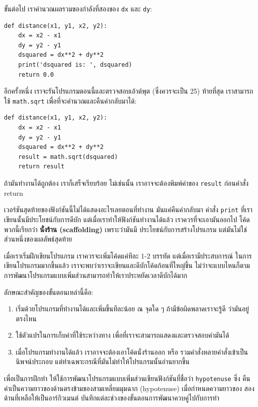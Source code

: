 ขั้นต่อไป เราคำนวณผลรวมของกำลังที่สองของ {\tt dx} และ {\tt dy}:

\begin{verbatim}
def distance(x1, y1, x2, y2):
    dx = x2 - x1
    dy = y2 - y1
    dsquared = dx**2 + dy**2
    print('dsquared is: ', dsquared)
    return 0.0
\end{verbatim}
%
อีกครั้งหนึ่ง เราจะรันโปรแกรมตอนนี้และตรวจสอบเอ้าต์พุต (ซึ่งควรจะเป็น 25)
ท้ายที่สุด เราสามารถใช้ {\tt math.sqrt} เพื่อที่จะคำนวณและคืนค่ากลับมาได้:

\begin{verbatim}
def distance(x1, y1, x2, y2):
    dx = x2 - x1
    dy = y2 - y1
    dsquared = dx**2 + dy**2
    result = math.sqrt(dsquared)
    return result
\end{verbatim}
%
ถ้ามันทำงานได้ถูกต้อง เราก็เสร็จเรียบร้อย ไม่เช่นนั้น เราอาจจะต้องพิมพ์ค่าของ {\tt result} ก่อนคำสั่ง return

เวอร์ชันสุดท้ายของฟังก์ชันนี้ไม่ได้แสดงอะไรเลยตอนที่ทำงาน มันแค่คืนค่ากลับมา คำสั่ง {\tt print} 
ที่เราเขียนนั้นมีประโยชน์กับการดีบัก แต่เมื่อเราทำให้ฟังก์ชันทำงานได้แล้ว 
เราควรที่จะเอามันออกไป โค้ดพวกนี้เรียกว่า {\bf นั่งร้าน (scaffolding)} เพราะว่ามันมี
ประโยชน์กับการสร้างโปรแกรม แต่มันไม่ใช่ส่วนหนึ่งของผลลัพธ์สุดท้าย

เมื่อเราเริ่มฝึกเขียนโปรแกรม เราควรจะเพิ่มโค้ดแค่ทีละ 1-2 บรรทัด แต่เมื่อเรามีประสบการณ์
ในการเขียนโปรแกรมมากขึ้นแล้ว เราจะพบว่าเราจะเขียนและดีบักโค้ดก้อนที่ใหญ่ขึ้น ไม่ว่าจะแบบไหนก็ตาม
การพัฒนาโปรแกรมแบบเพิ่มส่วนสามารถทำให้เราประหยัดเวลาดีบักได้มาก

ลักษณะสำคัญของขั้นตอนเหล่านี้คือ:


\begin{enumerate}

\item เริ่มด้วยโปรแกรมที่ทำงานได้และเพิ่มขึ้นทีละน้อย ณ จุดใด ๆ ถ้ามีข้อผิดพลาดเราจะรู้ดี
ว่ามันอยู่ตรงไหน

\item ใช้ตัวแปรในการเก็บค่าที่ใช้ระหว่างทาง เพื่อที่เราจะสามารถแสดงและตรวจสอบค่ามันได้

\item เมื่อโปรแกรมทำงานได้แล้ว เราอาจจะต้องเอาโค้ดนั่งร้านออก หรือ รวมคำสั่งหลายคำสั่งเข้าเป็น
นิพจน์ประกอบ แต่ทำเฉพาะกรณีที่มันไม่ทำให้โปรแกรมนั้นอ่านยากขึ้น

\end{enumerate}

เพื่อเป็นการฝึกทำ ให้ใช้การพัฒนาโปรแกรมแบบเพิ่มส่วนเขียนฟังก์ชันที่ชื่อว่า {\tt hypotenuse} ซึ่ง
คืนค่าเป็นความยาวของด้านตรงข้ามของสามเหลี่ยมมุมฉาก (hypotenuse) เมื่อกำหนดความยาวของ
สองด้านที่เหลือให้เป็นอาร์กิวเมนต์ บันทึกแต่ละช่วงของขั้นตอนการพัฒนาควบคู่ไปกับการทำ



